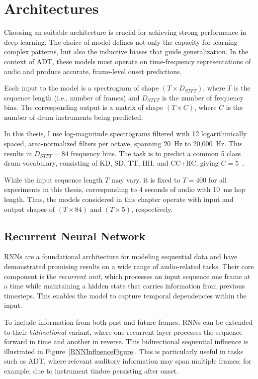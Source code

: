 \chapter{Architectures}\label{Architectures}

Choosing an suitable architecture is crucial for achieving strong performance in deep learning. The choice of model defines not only the capacity for learning complex patterns, but also the inductive biases that guide generalization. In the context of \gls{ADT}, these models must operate on time-frequency representations of audio and produce accurate, frame-level onset predictions.

Each input to the model is a spectrogram of shape $(T \times D_{STFT})$, where $T$ is the sequence length (i.e., number of frames) and $D_{STFT}$ is the number of frequency bins. The corresponding output is a matrix of shape $(T \times C)$, where $C$ is the number of drum instruments being predicted.

In this thesis, I use log-magnitude spectrograms filtered with 12 logarithmically spaced, area-normalized filters per octave, spanning 20~Hz to 20,000~Hz. This results in $D_{STFT} = 84$ frequency bins. The task is to predict a common 5 class drum vocabulary, consisting of \acrfull{KD}, \acrfull{SD}, \acrfull{TT}, \acrfull{HH}, and \acrfull{CC+RC}, giving $C = 5$~\cite{zehren2024analyzingreducingsynthetictorealtransfer}.

While the input sequence length $T$ may vary, it is fixed to $T = 400$ for all experiments in this thesis, corresponding to 4 seconds of audio with 10~ms hop length. Thus, the models considered in this chapter operate with input and output shapes of $(T \times 84)$ and $(T \times 5)$, respectively.

\section{Recurrent Neural Network}

\glspl{RNN} are a foundational architecture for modeling sequential data and have demonstrated promising results on a wide range of audio-related tasks. Their core component is the \textit{recurrent unit}, which processes an input sequence one frame at a time while maintaining a hidden state that carries information from previous timesteps. This enables the model to capture temporal dependencies within the input.

To include information from both past and future frames, \glspl{RNN} can be extended to their \textit{bidirectional} variant, where one recurrent layer processes the sequence forward in time and another in reverse. This bidirectional sequential influence is illustrated in Figure~\ref{RNNInfluenceFigure}. This is particularly useful in tasks such as \gls{ADT}, where relevant auditory information may span multiple frames; for example, due to instrument timbre persisting after onset.

